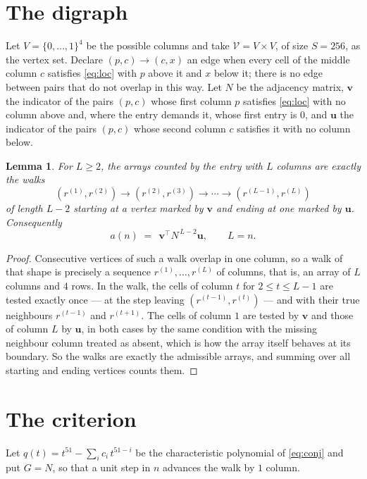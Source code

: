 \documentclass[11pt,a4paper]{article}
\theoremstyle{plain}
\newtheorem{lemma}[theorem]{Lemma}
\theoremstyle{definition}
\begin{document}
\section{The digraph}

Let $V=\{0,\dots,1\}^{4}$ be the possible columns and take
$\mathcal V=V\times V$, of size $S=256$, as the vertex set. Declare $(p,c)\to(c,x)$ an edge
when every cell of the middle column $c$ satisfies \eqref{eq:loc} with $p$ above it and $x$
below it; there is no edge between pairs that do not overlap in this way. Let $N$ be the
adjacency matrix, $\mathbf{v}$ the indicator of the pairs $(p,c)$ whose first column $p$
satisfies \eqref{eq:loc} with no column above and, where the entry demands it, whose first entry is $0$, and $\mathbf{u}$ the indicator of
the pairs $(p,c)$ whose second column $c$ satisfies it with no column below.

\begin{lemma}\label{lem:walk}
For $L\ge2$, the arrays counted by the entry with $L$ columns are exactly the walks
\[
(r^{(1)},r^{(2)})\to(r^{(2)},r^{(3)})\to\cdots\to(r^{(L-1)},r^{(L)})
\]
of length $L-2$ starting at a vertex marked by $\mathbf{v}$ and ending at one marked by
$\mathbf{u}$. Consequently
\[
a(n)\;=\;\,\mathbf{v}^{\!\top}N^{\,L-2}\mathbf{u},\qquad L=n .
\]
\end{lemma}

\begin{proof}
Consecutive vertices of such a walk overlap in one column, so a walk of that shape is
precisely a sequence $r^{(1)},\dots,r^{(L)}$ of columns, that is, an array of $L$ columns
and $4$ rows. In the walk, the cells of column $t$ for $2\le t\le L-1$ are tested
exactly once --- at the step leaving $(r^{(t-1)},r^{(t)})$ --- and with their true
neighbours $r^{(t-1)}$ and $r^{(t+1)}$. The cells of column $1$ are tested by
$\mathbf{v}$ and those of column $L$ by $\mathbf{u}$, in both cases by the same condition
with the missing neighbour column treated as absent, which is how the array itself behaves at
its boundary. So the walks are exactly the admissible arrays, and summing over all starting
and ending vertices counts them.
\end{proof}

\section{The criterion}

Let $q(t)=t^{51}-\sum_i c_i\,t^{51-i}$ be the characteristic polynomial of
\eqref{eq:conj} and put $G=N$, so that a unit step in $n$ advances the walk by
$1$ column.
\end{document}
